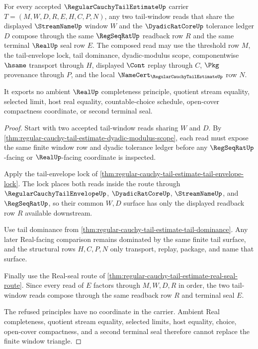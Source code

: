 \begin{theorem}
\label{thm:regular-cauchy-tail-estimate-window-triangle}
For every accepted $\RegularCauchyTailEstimateUp$ carrier
$T=(M,W,D,R,E,H,C,P,N)$, any two tail-window reads that share the displayed
$\StreamNameUp$ window $W$ and the $\DyadicRatCoreUp$ tolerance ledger $D$
compose through the same $\RegSeqRatUp$ readback row $R$ and the same terminal
$\RealUp$ seal row $E$. The composed read may use the threshold row $M$,
the tail-envelope lock, tail dominance, dyadic-modulus scope, componentwise
$\hsame$ transport through $H$, displayed $\Cont$ replay through $C$, $\Pkg$
provenance through $P$, and the local
$\NameCert_{\RegularCauchyTailEstimateUp}$ row $N$.

It exports no ambient $\RealUp$ completeness principle, quotient stream
equality, selected limit, host real equality, countable-choice schedule,
open-cover compactness coordinate, or second terminal seal.
\end{theorem}
\begin{proof}
Start with two accepted tail-window reads sharing $W$ and $D$. By
\autoref{thm:regular-cauchy-tail-estimate-dyadic-modulus-scope}, each read
must expose the same finite window row and dyadic tolerance ledger before any
$\RegSeqRatUp$-facing or $\RealUp$-facing coordinate is inspected.

Apply the tail-envelope lock of
\autoref{thm:regular-cauchy-tail-estimate-tail-envelope-lock}. The lock places
both reads inside the route through $\RegularCauchyTailEnvelopeUp$,
$\DyadicRatCoreUp$, $\StreamNameUp$, and $\RegSeqRatUp$, so their common
$W,D$ surface has only the displayed readback row $R$ available downstream.

Use tail dominance from
\autoref{thm:regular-cauchy-tail-estimate-tail-dominance}. Any later
Real-facing comparison remains dominated by the same finite tail surface, and
the structural rows $H,C,P,N$ only transport, replay, package, and name that
surface.

Finally use the Real-seal route of
\autoref{thm:regular-cauchy-tail-estimate-real-seal-route}. Since every read
of $E$ factors through $M,W,D,R$ in order, the two tail-window reads compose
through the same readback row $R$ and terminal seal $E$.

The refused principles have no coordinate in the carrier. Ambient Real
completeness, quotient stream equality, selected limits, host equality,
choice, open-cover compactness, and a second terminal seal therefore cannot
replace the finite window triangle.
\end{proof}

